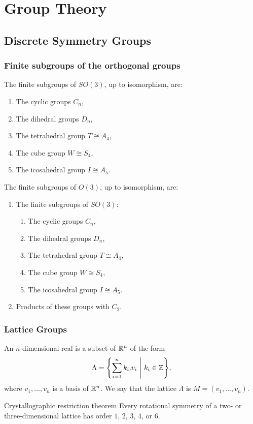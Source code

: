 \part{Group Theory}
\chapter{Discrete Symmetry Groups}
\section{Finite subgroups of the orthogonal groups}
\begin{importanttheorem}{}{}
	The finite subgroups of $SO(3)$, up to isomorphism, are:
	\begin{enumerate}
		\item The cyclic groups $C_n$,
		\item The dihedral groups $D_n$,
		\item The tetrahedral group $T \cong A_4$,
		\item The cube group $W \cong S_4$,
		\item The icosahedral group $I \cong A_5$.
	\end{enumerate}
\end{importanttheorem}
\begin{importantcorollary}{}{}
	The finite subgroups of $O(3)$, up to isomorphism, are:
	\begin{enumerate}
		\item The finite subgroups of $SO(3)$:
		\begin{enumerate}
			\item The cyclic groups $C_n$,
			\item The dihedral groups $D_n$,
			\item The tetrahedral group $T \cong A_4$,
			\item The cube group $W \cong S_4$,
			\item The icosahedral group $I \cong A_5$.
		\end{enumerate}
		\item Products of these groups with $C_2$.
	\end{enumerate}
\end{importantcorollary}
\section{Lattice Groups}
\begin{definition}
	An $n$-dimensional real  is a subset of $\mathbb{R}^n$ of the form
	\begin{align*}
		\Lambda = \qty{\sum_{i = 1}^n k_i.v_i ~\middle|~k_i \in \mathbb{Z}},
	\end{align*}
	where $v_1, \hdots, v_n$ is a basis of $\mathbb{R}^n$. We say that the lattice $\Lambda$ is  $M = (v_1, \hdots, v_n)$.
\end{definition}
\begin{importanttheorem}{Crystallographic restriction theorem}{}
	Every rotational symmetry of a two- or three-dimensional lattice has order $1$, $2$, $3$, $4$, or $6$.
\end{importanttheorem}
